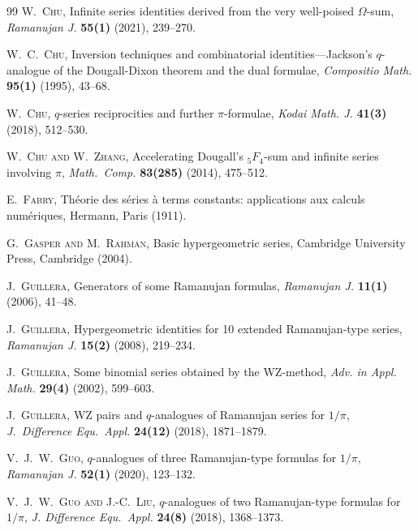 \documentclass[12pt]{article}
\begin{document}
\begin{thebibliography}{99}
 \textsc{W.\ Chu}, 
 Infinite series identities derived from the very well-poised {$\Omega$}-sum, 
 \emph{Ramanujan J.} {\bf 55(1)} (2021), 239--270. 

 \textsc{W.\ C.\ Chu}, 
 Inversion techniques and combinatorial identities---{J}ackson's {$q$}-analogue of the
 {D}ougall-{D}ixon theorem and the dual formulae, 
 \emph{Compositio Math.} {\bf 95(1)} (1995), 43--68. 

 \textsc{W.\ Chu}, 
 {$q$}-series reciprocities and further {$\pi$}-formulae, 
 \emph{Kodai Math. J.} {\bf 41(3)} (2018), 512--530. 

 \textsc{W.\ Chu and W.\ Zhang}, 
 Accelerating {D}ougall's {${}_5F_4$}-sum and infinite series involving {$\pi$}, 
 \emph{Math.\ Comp.} {\bf 83(285)} (2014), 475--512. 

 \textsc{E.\ Fabry}, 
 Th\'{e}orie des s\'{e}ries \`{a} terms constants: applications aux calculs num\'{e}riques, 
 Hermann, Paris (1911). 

 \textsc{G.\ Gasper and M.\ Rahman}, 
 Basic hypergeometric series, 
 Cambridge University Press, Cambridge (2004). 
 
 \textsc{J.\ Guillera}, 
 Generators of some {R}amanujan formulas, 
 \emph{Ramanujan J.} {\bf 11(1)} (2006), 41--48. 

 \textsc{J.\ Guillera}, 
 Hypergeometric identities for 10 extended {R}amanujan-type series, 
 \emph{Ramanujan J.} {\bf 15(2)} (2008), 219--234. 

 \textsc{J.\ Guillera}, 
 Some binomial series obtained by the {WZ}-method, 
 \emph{Adv. in Appl. Math.} {\bf 29(4)} (2002), 599--603. 

 \textsc{J.\ Guillera}, 
 W{Z} pairs and {$q$}-analogues of {R}amanujan series for {$1/\pi$}, 
 \emph{J.\ Difference Equ.\ Appl.} {\bf 24(12)} (2018), 1871--1879. 

 \textsc{V.\ J.\ W.\ Guo}, 
 {$q$}-analogues of three {R}amanujan-type formulas for {$1/\pi$}, 
 \emph{Ramanujan J.} {\bf 52(1)} (2020), 123--132. 

 \textsc{V.\ J.\ W.\ Guo and J.-C.\ Liu}, 
 {$q$}-analogues of two {R}amanujan-type formulas for {$1/\pi$}, 
 \emph{J. Difference Equ.\ Appl.} {\bf 24(8)} (2018), 1368--1373. 


\end{thebibliography}
\end{document}
